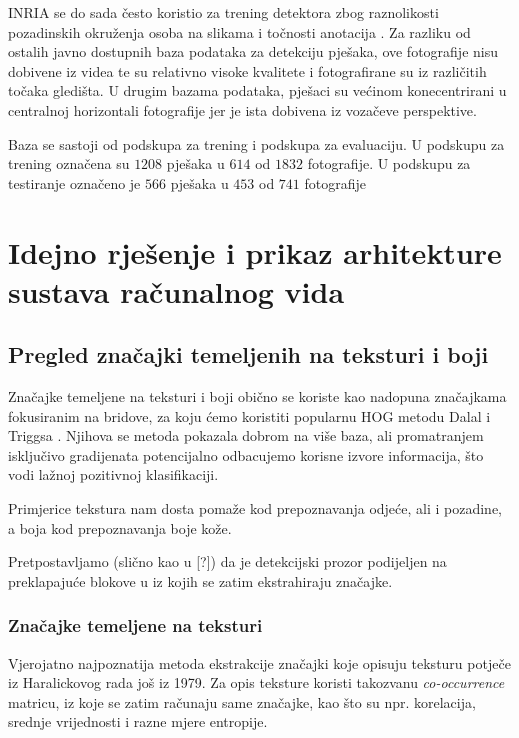 \documentclass[seminar]{fer}
\begin{document}
INRIA se do sada često koristio za trening detektora zbog raznolikosti pozadinskih okruženja osoba na slikama i točnosti anotacija \cite{BenensonOHS14}. Za razliku od ostalih javno dostupnih baza podataka za detekciju pješaka, ove fotografije nisu dobivene iz videa te su relativno visoke kvalitete i fotografirane su iz različitih točaka gledišta. U drugim bazama podataka, pješaci su većinom konecentrirani u centralnoj horizontali fotografije jer je ista dobivena iz vozačeve perspektive.

Baza se sastoji od podskupa za trening i podskupa za evaluaciju. U podskupu za trening označena su $1208$ pješaka u $614$ od $1832$ fotografije. U podskupu za testiranje označeno je $566$ pješaka u $453$ od $741$ fotografije \cite{Dollar:2012:PDE:2197081.2197275}

\chapter{Idejno rješenje i prikaz arhitekture sustava računalnog vida}

\section{Pregled značajki temeljenih na teksturi i boji}

Značajke temeljene na teksturi i boji obično se koriste kao nadopuna značajkama fokusiranim na bridove, za koju ćemo koristiti popularnu HOG
metodu Dalal i Triggsa \cite{HOG}. Njihova se metoda pokazala dobrom na više baza, ali promatranjem isključivo gradijenata potencijalno odbacujemo
korisne izvore informacija, što vodi lažnoj pozitivnoj klasifikaciji.

Primjerice tekstura nam dosta pomaže kod prepoznavanja odjeće, ali i pozadine, a boja kod prepoznavanja boje kože.


Pretpostavljamo (slično kao u [?]) da je detekcijski prozor podijeljen na preklapajuće blokove u iz kojih se zatim ekstrahiraju značajke.

\subsection{Značajke temeljene na teksturi}

Vjerojatno najpoznatija metoda ekstrakcije značajki koje opisuju teksturu potječe iz Haralickovog rada \cite{Haralick} još iz 1979. Za opis teksture koristi takozvanu \emph{co-occurrence} matricu, iz koje se zatim računaju same značajke, kao što su npr. korelacija, srednje vrijednosti i razne mjere entropije.
\end{document}
